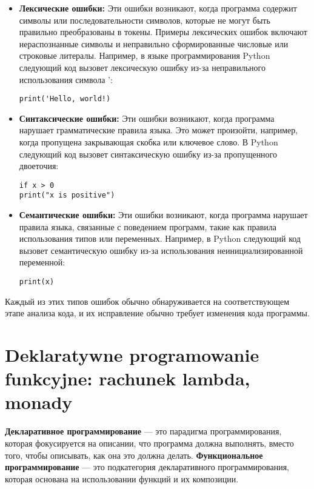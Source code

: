 \begin{itemize}
\item \textbf{Лексические ошибки:} Эти ошибки возникают, когда программа содержит символы или последовательности символов, которые не могут быть правильно преобразованы в токены. Примеры лексических ошибок включают нераспознанные символы и неправильно сформированные числовые или строковые литералы. Например, в языке программирования Python следующий код вызовет лексическую ошибку из-за неправильного использования символа ':

\begin{verbatim}
print('Hello, world!)
\end{verbatim}

\item \textbf{Синтаксические ошибки:} Эти ошибки возникают, когда программа нарушает грамматические правила языка. Это может произойти, например, когда пропущена закрывающая скобка или ключевое слово. В Python следующий код вызовет синтаксическую ошибку из-за пропущенного двоеточия:

\begin{verbatim}
if x > 0
print("x is positive")
\end{verbatim}

\item \textbf{Семантические ошибки:} Эти ошибки возникают, когда программа нарушает правила языка, связанные с поведением программ, такие как правила использования типов или переменных. Например, в Python следующий код вызовет семантическую ошибку из-за использования неинициализированной переменной:

\begin{verbatim}
print(x)
\end{verbatim}
\end{itemize}

Каждый из этих типов ошибок обычно обнаруживается на соответствующем этапе анализа кода, и их исправление обычно требует изменения кода программы.



\section{Deklaratywne programowanie funkcyjne: rachunek lambda, monady}

\textbf{Декларативное программирование} — это парадигма программирования, которая фокусируется на описании, что программа должна выполнять, вместо того, чтобы описывать, как она это должна делать. \textbf{Функциональное программирование} — это подкатегория декларативного программирования, которая основана на использовании функций и их композиции.


